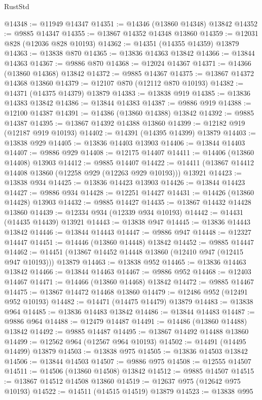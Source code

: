 \begin{lexlean}{RustStd}
\begin{coremodule}
@14348 := @11949 @14347
@14351 := @14346 (@13860 @14348) @13842
@14352 := @9885 @14347
@14355 := @13867 @14352 @14348 @13860
@14359 := @12031 @828 (@12036 @828 @10193)
@14362 := @14351 (@14355 @14359) @13879
@14363 := @13838 @870
@14365 := @13836 @14363 @13842
@14366 := @13844 @14363
@14367 := @9886 @870
@14368 := @12024 @14367
@14371 := @14366 (@13860 @14368) @13842
@14372 := @9885 @14367
@14375 := @13867 @14372 @14368 @13860
@14379 := @12107 @870 (@12112 @870 @10193)
@14382 := @14371 (@14375 @14379) @13879
@14383 := @13838 @919
@14385 := @13836 @14383 @13842
@14386 := @13844 @14383
@14387 := @9886 @919
@14388 := @12100 @14387
@14391 := @14386 (@13860 @14388) @13842
@14392 := @9885 @14387
@14395 := @13867 @14392 @14388 @13860
@14399 := @12182 @919 (@12187 @919 @10193)
@14402 := @14391 (@14395 @14399) @13879
@14403 := @13838 @929
@14405 := @13836 @14403 @13903
@14406 := @13844 @14403
@14407 := @9886 @929
@14408 := @12175 @14407
@14411 := @14406 (@13860 @14408) @13903
@14412 := @9885 @14407
@14422 := @14411 (@13867 @14412 @14408 @13860 (@12258 @929 (@12263 @929 @10193))) @13921
@14423 := @13838 @934
@14425 := @13836 @14423 @13903
@14426 := @13844 @14423
@14427 := @9886 @934
@14428 := @12251 @14427
@14431 := @14426 (@13860 @14428) @13903
@14432 := @9885 @14427
@14435 := @13867 @14432 @14428 @13860
@14439 := @12334 @934 (@12339 @934 @10193)
@14442 := @14431 (@14435 @14439) @13921
@14443 := @13838 @947
@14445 := @13836 @14443 @13842
@14446 := @13844 @14443
@14447 := @9886 @947
@14448 := @12327 @14447
@14451 := @14446 (@13860 @14448) @13842
@14452 := @9885 @14447
@14462 := @14451 (@13867 @14452 @14448 @13860 (@12410 @947 (@12415 @947 @10193))) @13879
@14463 := @13838 @952
@14465 := @13836 @14463 @13842
@14466 := @13844 @14463
@14467 := @9886 @952
@14468 := @12403 @14467
@14471 := @14466 (@13860 @14468) @13842
@14472 := @9885 @14467
@14475 := @13867 @14472 @14468 @13860
@14479 := @12486 @952 (@12491 @952 @10193)
@14482 := @14471 (@14475 @14479) @13879
@14483 := @13838 @964
@14485 := @13836 @14483 @13842
@14486 := @13844 @14483
@14487 := @9886 @964
@14488 := @12479 @14487
@14491 := @14486 (@13860 @14488) @13842
@14492 := @9885 @14487
@14495 := @13867 @14492 @14488 @13860
@14499 := @12562 @964 (@12567 @964 @10193)
@14502 := @14491 (@14495 @14499) @13879
@14503 := @13838 @975
@14505 := @13836 @14503 @13842
@14506 := @13844 @14503
@14507 := @9886 @975
@14508 := @12555 @14507
@14511 := @14506 (@13860 @14508) @13842
@14512 := @9885 @14507
@14515 := @13867 @14512 @14508 @13860
@14519 := @12637 @975 (@12642 @975 @10193)
@14522 := @14511 (@14515 @14519) @13879
@14523 := @13838 @995

\end{coremodule}
\end{lexlean}
